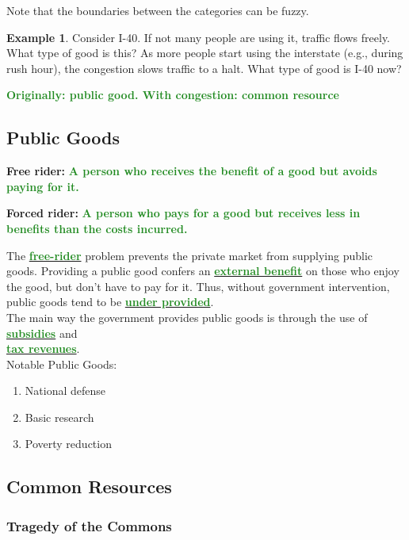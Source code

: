 \documentclass[11pt]{article}\usepackage[]{graphicx}\usepackage[]{color}
\theoremstyle{definition}
\newtheorem{exmp}{Example}[section]
\newcommand{\ddp}[1]{{\textbf{\textcolor{ForestGreen}{#1}}}}
\newcommand{\dd}[1]{{\underline{\textbf{\textcolor{ForestGreen}{#1}}}}}
\newcommand{\defn}[1]{\textbf{#1}}
\begin{document}
	Note that the boundaries between the categories can be fuzzy.
	
	
	\begin{exmp} 
		Consider I-40. If not many people are using it, traffic flows freely. What type of good is this? As more people start using the interstate (e.g., during rush hour), the congestion slows traffic to a halt. What type of good is I-40 now?
	\end{exmp}
	\ddp{Originally: public good. With congestion: common resource}
	
	\subsection{Public Goods}
	
	\defn{Free rider:} \ddp{A person who receives the benefit of a good but avoids paying for it.\\}
	
	
	\defn{Forced rider:} \ddp{A person who pays for a good but receives less in benefits than the costs incurred.\\}
	
	
	The \dd{free-rider} problem prevents the private market from supplying public goods. Providing a public good confers an \dd{external benefit} on those who enjoy the good, but don't have to pay for it. Thus, without government intervention, public goods tend to be \dd{under provided}.
	\\
	
	The main way the government provides public goods is through the use of \dd{subsidies} and \\ \dd{tax revenues}.
	\\
	
	Notable Public Goods:
	\begin{enumerate}
		\item National defense 
		\item Basic research
		\item Poverty reduction
	\end{enumerate}
	
	\subsection{Common Resources}
	
	\subsubsection*{Tragedy of the Commons}
	
\end{document}
